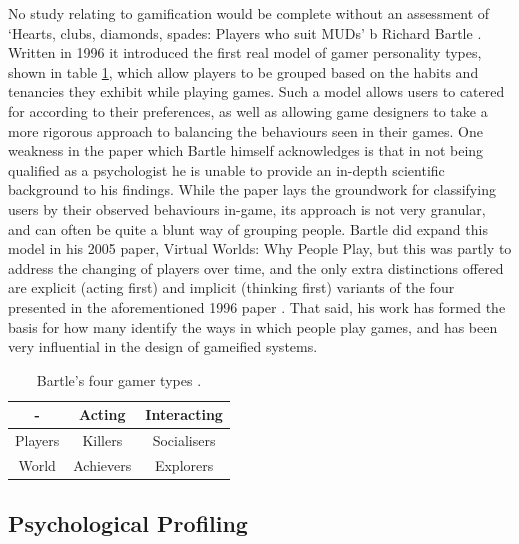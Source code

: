 \documentclass[12pt]{article}
\begin{document}
No study relating to gamification would be complete without an assessment of `Hearts, clubs, diamonds, spades: Players who suit MUDs' b Richard Bartle \cite{bartle1996hearts}. Written in 1996 it introduced the first real model of gamer personality types, shown in table \ref{table:cards}, which allow players to be grouped based on the habits and tenancies they exhibit while playing games. Such a model allows users to catered for according to their preferences, as well as allowing game designers to take a more rigorous approach to balancing the behaviours seen in their games.  One weakness in the paper which Bartle himself acknowledges is that in not being qualified as a psychologist he is unable to provide an in-depth scientific background to his findings. While the paper lays the groundwork for classifying users by their observed behaviours in-game, its approach is not very granular, and can often be quite a blunt way of grouping people. Bartle did expand this model in his 2005 paper, Virtual Worlds: Why People Play, but this was partly to address the changing of players over time, and the only extra distinctions offered are explicit (acting first) and implicit (thinking first) variants of the four presented in the aforementioned 1996 paper \cite{bartle2005play}. That said, his work has formed the basis for how many identify the ways in which people play games, and has been very influential in the design of gameified systems.

\begin{table}[p]
\begin{center}
\begin{tabular}{|c|c|c|}
	\hline - & Acting & Interacting \\ 
	\hline Players & Killers & Socialisers \\ 
	\hline World & Achievers & Explorers \\ 
	\hline 
\end{tabular}
\end{center}
\caption{Bartle's four gamer types \cite{bartle1996hearts}.}
\label{table:cards}
\end{table}

\subsection{Psychological Profiling}
\end{document}
